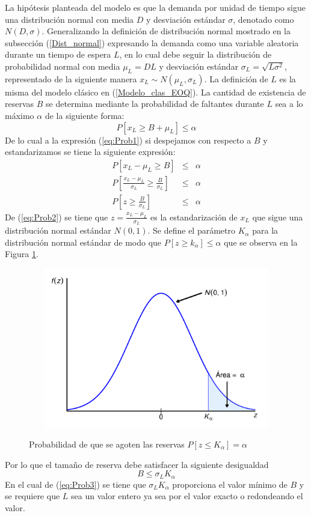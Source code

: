 La hipótesis planteada del modelo es que la demanda por unidad de tiempo sigue una distribución normal con media $D$ y desviación estándar $\sigma$, denotado como $N(D,\sigma)$. Generalizando la definición de distribución normal mostrado en la subsección (\ref{Dist_normal}) expresando la demanda como una variable aleatoria durante un tiempo de espera $L$, en lo cual debe seguir la distribución de probabilidad normal con media ${\mu}_{L} = DL$ y desviación estándar ${\sigma}_{L} = \sqrt{L {\sigma}^{2}}$, representado de la siguiente manera ${x}_{L} \sim N({\mu}_{L},{\sigma}_{L})$. La definición de $L$ es la misma del modelo clásico en (\ref{Modelo_clas_EOQ}).
La cantidad de existencia de reservas $B$ se determina mediante la probabilidad de faltantes durante $L$ sea a lo máximo $\alpha$ de la siguiente forma:
\begin{equation}
	\label{eq:Prob1}
	P[ {x}_{L} \geq B + {\mu}_{L} ] \leq \alpha
\end{equation}
De lo cual a la expresión (\ref{eq:Prob1}) si despejamos con respecto a $B$ y estandarizamos se tiene la siguiente expresión:
\begin{eqnarray}
	\label{eq:Prob2}
	P[ {x}_{L} - {\mu}_{L} \geq B  ] &\leq& \alpha \nonumber \\
	P \left[ \frac{{x}_{L} - {\mu}_{L}}{{\sigma}_{L}} \geq \frac{B}{{\sigma}_{L}} \right] &\leq& \alpha \nonumber \\
	P \left[ z \geq \frac{B}{{\sigma}_{L}} \right] &\leq& \alpha 
\end{eqnarray}
De (\ref{eq:Prob2}) se tiene que $z = \frac{{x}_{L} - {\mu}_{L}}{{\sigma}_{L}}$ es la estandarización de ${x}_{L}$ que sigue una distribución normal estándar $N(0,1)$. Se define el parámetro ${K}_{\alpha}$ para la distribución normal estándar de modo que $P[z \geq {k}_{\alpha}] \leq \alpha$ que se observa en la Figura \ref{fig:img10}.
\begin{figure}[H]
  \caption{Probabilidad de que se agoten las reservas $P[z \leq {K}_{\alpha}] = \alpha$}
  {\includegraphics[width=15cm, height=7cm]{images/img10.pdf}}
  \label{fig:img10}
\end{figure} 
Por lo que el tamaño de reserva debe satisfacer la siguiente desigualdad
\newpage
\begin{equation}
	\label{eq:Prob3}
	B \leq {\sigma}_{L} {K}_{\alpha}
\end{equation}
En el cual de (\ref{eq:Prob3}) se tiene que ${\sigma}_{L}{K}_{\alpha}$ proporciona el valor mínimo de $B$ y se requiere que $L$ sea un valor entero ya sea por el valor exacto o redondeando el valor.

